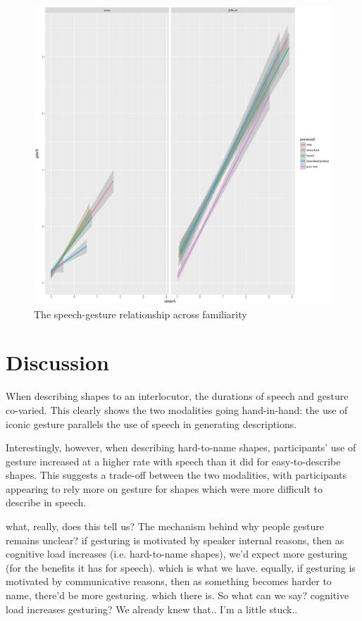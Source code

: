 \documentclass[a4paper,man,natbib]{apa6}
\begin{document}
\begin{figure}
  \centering
	\includegraphics[width=\linewidth]{prev_plot.png}
  \caption{The speech-gesture relationship across familiarity}
  \label{fig:prev}
\end{figure}


\section{Discussion}

When describing shapes to an interlocutor, the durations of speech and gesture co-varied.
This clearly shows the two modalities going hand-in-hand: the use of iconic gesture parallels the use of speech in generating descriptions.

Interestingly, however, when describing hard-to-name shapes, participants' use of gesture increased at a higher rate with speech than it did for easy-to-describe shapes.
This suggests a trade-off between the two modalities, with participants appearing to rely more on gesture for shapes which were more difficult to describe in speech.

what, really, does this tell us?
The mechanism behind why people gesture remains unclear?
if gesturing is motivated by speaker internal reasons, then as cognitive load increases (i.e. hard-to-name shapes), we'd expect more gesturing (for the benefits it has for speech). 
which is what we have.
equally, if gesturing is motivated by communicative reasons, then as something becomes harder to name, there'd be more gesturing.
which there is.
So what can we say? cognitive load increases gesturing? We already knew that..
I'm a little stuck..
\end{document}
